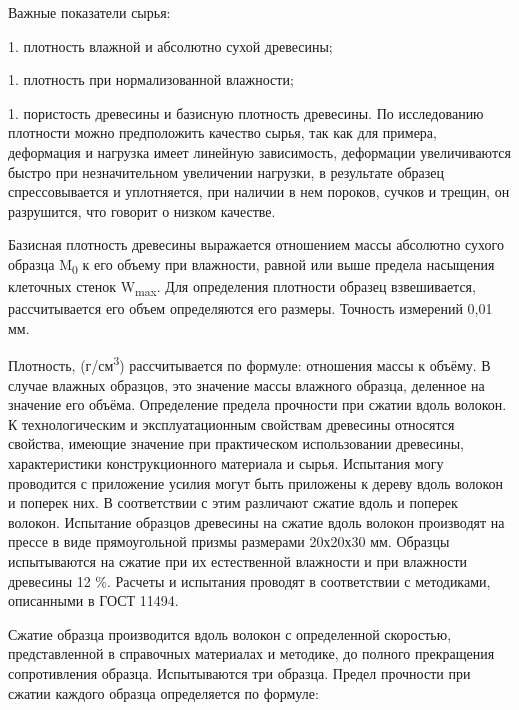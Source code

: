 Важные показатели сырья:


1. плотность влажной и абсолютно сухой древесины;

1. плотность при нормализованной влажности;

1. пористость древесины и базисную плотность древесины.
По исследованию плотности можно предположить качество сырья, так как для
примера, деформация и нагрузка имеет линейную зависимость, деформации
увеличиваются быстро при незначительном увеличении нагрузки, в
результате образец спрессовывается и уплотняется, при наличии в нем
пороков, сучков и трещин, он разрушится, что говорит о низком качестве.

Базисная плотность древесины выражается отношением массы абсолютно
сухого образца M\textsubscript{0} к его объему при влажности, равной или
выше предела насыщения клеточных стенок W\textsubscript{max}. Для
определения плотности образец взвешивается, рассчитывается его объем
определяются его размеры. Точность измерений 0,01 мм.

Плотность, (г/см\textsuperscript{3}) рассчитывается по формуле:
отношения массы к объёму. В случае влажных образцов, это значение массы
влажного образца, деленное на значение его объёма. Определение предела
прочности при сжатии вдоль волокон. К технологическим и эксплуатационным
свойствам древесины относятся свойства, имеющие значение при
практическом использовании древесины, характеристики конструкционного
материала и сырья. Испытания могу проводится с приложение усилия могут
быть приложены к дереву вдоль волокон и поперек них. В соответствии с
этим различают сжатие вдоль и поперек волокон. Испытание образцов
древесины на сжатие вдоль волокон производят на прессе в виде
прямоугольной призмы размерами 20х20х30 мм. Образцы испытываются на
сжатие при их естественной влажности и при влажности древесины 12 \%.
Расчеты и испытания проводят в соответствии с методиками, описанными в
ГОСТ 11494.

Сжатие образца производится вдоль волокон с определенной скоростью,
представленной в справочных материалах и методике, до полного
прекращения сопротивления образца. Испытываются три образца. Предел
прочности при сжатии каждого образца определяется по формуле:


